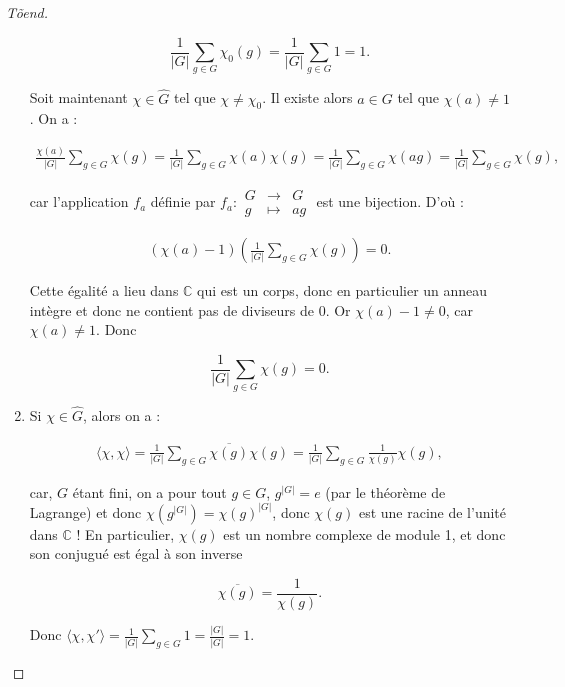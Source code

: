 \documentclass[french]{book}
\theoremstyle{definition}
\theoremstyle{remark}
\begin{document}
\begin{proof}[T\~{o}end]
\begin{enumerate}
    \[\frac{1}{\lvert G \rvert} \sum_{g \in G}^{} \chi_0(g) = \frac{1}{\lvert G \rvert} \sum_{g \in G}^{} 1 = 1.\]

    Soit maintenant \(\chi \in \hat{G}\) tel que \(\chi \neq \chi_0\). Il existe alors \(a \in G\) tel que \(\chi(a) \neq 1\). On a :

    \begin{gather*}
      \frac{\chi(a)}{\lvert G \rvert} \sum_{g \in G}^{} \chi(g) = \frac{1}{\lvert G \rvert} \sum_{g \in G}^{} \chi(a) \chi(g) = \frac{1}{\lvert G \rvert}\sum_{g \in G}^{}  \chi(ag)= \frac{1}{\lvert G \rvert} \sum_{g \in G}^{} \chi(g),
    \end{gather*}

    car l'application \(f_a\) définie par \(f_a : \begin{matrix}
    G & \longrightarrow & G \\
    g & \longmapsto & ag
    \end{matrix}\) est une bijection. D'où :

    \begin{gather*}
      (\chi(a) - 1) \left(\frac{1}{\lvert G \rvert} \sum_{g \in G}^{} \chi(g) \right) = 0.
    \end{gather*}

    Cette égalité a lieu dans \(\mathbb{C}\) qui est un corps, donc en particulier un anneau intègre et donc ne contient pas de diviseurs de 0. Or \(\chi(a) -1 \neq 0\), car \(\chi(a) \neq 1\). Donc

    \[\frac{1}{\lvert G \rvert}\sum_{g \in G}^{} \chi(g) = 0.\]

    \item Si \(\chi \in \hat{G}\), alors on a :

    \begin{gather*}
      \langle \chi, \chi \rangle  = \frac{1}{\lvert G \rvert} \sum_{g \in G} \overline{\chi(g)} \chi(g) = \frac{1}{\lvert G \rvert} \sum_{g \in G} \frac{1}{\chi(g)} \chi(g),
    \end{gather*}

    car, \(G\) étant fini, on a pour tout \(g \in G\), \(g ^{\lvert G \rvert} = e\) (par le théorème de Lagrange) et donc \(\chi(g ^{\lvert G \rvert})= \chi(g) ^{\lvert G \rvert}\), donc \(\chi(g)\) est une racine de l'unité dans \(\mathbb{C}\) ! En particulier, \(\chi(g)\) est un nombre complexe de module 1, et donc son conjugué est égal à son inverse

    \[\overline{\chi(g)} = \frac{1}{\chi(g)}.\]

    Donc \(\langle \chi, \chi' \rangle = \frac{1}{\lvert G \rvert} \sum_{g \in G} 1 = \frac{\lvert G \rvert}{\lvert G \rvert}=1. \)


\end{enumerate}
\end{proof}
\end{document}
